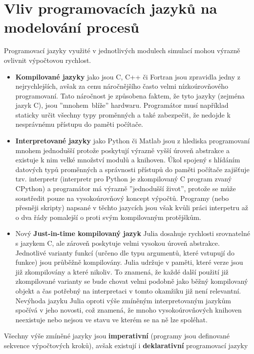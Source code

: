 \section{Vliv programovacích jazyků na modelování procesů}
\label{sec:proglang}
Programovací jazyky využité v jednotlivých modulech simulací mohou výrazně
ovlivnit výpočtovou rychlost.
\begin{itemize}
  \item
    \textbf{Kompilované jazyky} jako jsou C, C++ či Fortran jsou zpravidla
    jedny z nejrychlejších, avšak za cenu náročnějšího často velmi
    nízkoúrovňového programovaní. Tato náročnost je způsobena faktem, že tyto
    jazyky (zejména jazyk C), jsou ''mnohem~blíže'' hardwaru. Programátor musí
    například staticky určit všechny typy proměnných a také zabezpečit, že
    nedojde k nesprávnému přístupu do paměti počítače.
  \item
    \textbf{Interpretované jazyky} jako Python či Matlab jsou z hlediska
    programovaní mnohem jednodušší protože poskytují výrazně vyšší úroveň
    abstrakce a existuje k nim velké množství modulů a knihoven. Úkol spojený s
    hlídáním datových typů proměnných a správnosti přístupů do paměti počítače
    zajišťuje tzv. interpretr (interpretr pro Python je zkompilovaný C program
    zvaný CPython) a programátor má výrazně ''jednodušší život'', protože se
    může soustředit pouze na vysokoúrovňový koncept výpočtů. Programy (nebo
    přesněji skripty) napsané v těchto jazycích jsou však kvůli práci
    interpetru až o dva řády pomalejší o proti svým kompilovaným protějškům.
  \item
    Nový \textbf{Just-in-time kompilovaný jazyk} Julia \cite{julia2017}
    dosahuje rychlosti srovnatelné s jazykem C, ale zároveň poskytuje velmi
    vysokou úroveň abstrakce. Jednotlivé varianty funkcí (určeno dle typu
    argumentů, které vstupují do funkce) jsou průběžně kompilovány. Julia
    udržuje v paměti, které verze jsou již zkompilovány a které nikoliv.
    To znamená, že každé další použití již zkompilované varianty se bude chovat
    velmi podobně jako běžný kompilovaný objekt a čas potřebný na interpretaci
    v tomto okamžiku již není relevantní. Nevýhoda jazyku Julia oproti výše
    zmíněným interpretovaným jazykům spočívá v jeho novosti, což znamená, že
    mnoho vysokoúrovňových knihoven neexistuje nebo nejsou ve stavu ve kterém
    se na ně lze spoléhat.
\end{itemize}
Všechny výše zmíněné jazyky jsou \textbf{imperativní} (programy jsou definované
sekvence výpočtových kroků), avšak existují i \textbf{deklarativní} programovací jazyky
